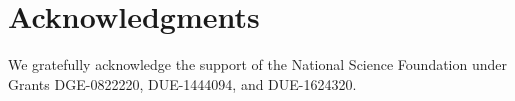 \documentclass[10pt, conference, compsocconf]{IEEEtran}
\begin{document}
%









\section*{Acknowledgments}

We gratefully acknowledge the support of the National Science Foundation under Grants DGE-0822220, DUE-1444094, and DUE-1624320.
\end{document}
